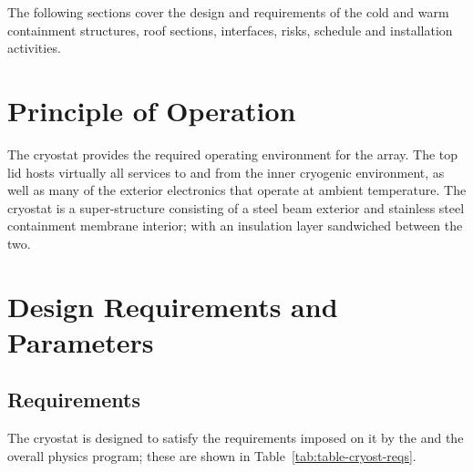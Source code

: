 The following sections cover the design and requirements of the cold and warm containment structures, roof sections, interfaces, risks, schedule and installation activities.

\section{Principle of Operation}
\label{sec:cryost-ovvw-prinoper}

The  cryostat provides the required operating environment for the  array.  The top lid hosts virtually all services to and from the inner cryogenic environment, as well as many of the exterior electronics that operate at ambient temperature.  The  cryostat is a super-structure consisting of a steel beam exterior and stainless steel containment membrane interior; with an insulation layer sandwiched between the two.  

\section{Design Requirements and Parameters}
\label{sec:cryost-ovvw-reqparam}

\subsection{Requirements}
\label{sec:cryost-ovvw-req}

The  cryostat is designed to satisfy the requirements imposed on it by the  and the overall physics program; these are shown in Table~\ref{tab:table-cryost-reqs}.

